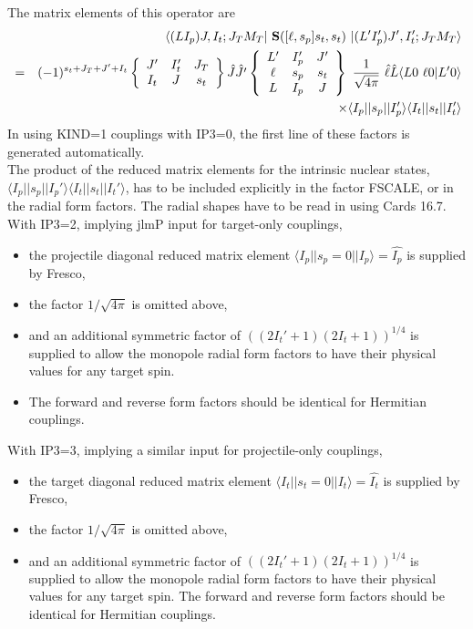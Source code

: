 \documentclass[11pt]{article}
\begin{document}
The  matrix elements of this operator are
\begin{eqnarray}
&& \langle(LI_p)J,I_t;J_TM_T | ~{\bf S}([\ell,s_p]s_t,s_t) ~| (L'I_p')J',I_t';J_TM_T \rangle
   \nonumber \\
& = &  (-1)^{s_t+J_T+J'+I_t}
   \left\{ \begin{array}{ccc}
    J'  & I_t' & J_T \\
    I_t & J    & s_t \\
    \end{array} \right\}   \hat{J} \hat{J'}
    \left\{ \begin{array}{ccc}
    L' & I_p' & J'  \\
    \ell & s_p & s_t  \\
    L & I_p & J  \\
    \end{array} \right\}  ~
     \frac{1}{\sqrt{4\pi}} ~ \hat{\ell} \hat{L} \langle L 0 \ \ell 0 | L'0 \rangle   \nonumber \\
    &  &   \times \langle I_p||s_p||I_p'\rangle \langle I_t||s_t||I_t'\rangle
\end{eqnarray}
In using KIND=1 couplings with IP3=0, the first line of these factors is generated automatically. \\
The product of the
reduced matrix elements for the intrinsic nuclear states,
$\langle I_p||s_p||I_p'\rangle \langle I_t||s_t||I_t'\rangle$,
 has to be included explicitly in the factor FSCALE,
 or in the radial form factors.
The radial shapes have to be read in using Cards 16.7.\\

With IP3=2, implying jlmP input for target-only couplings,
\begin{itemize}
\item
 the projectile diagonal reduced matrix element
$\langle I_p||s_p=0||I_p\rangle = \hat{I_p}$ is supplied by Fresco,
\item
the factor $1/\sqrt{4\pi}$ is omitted above,
\item
and an additional symmetric factor of
$((2I_t'+1)(2I_t+1))^{1/4}$
is supplied to allow the
monopole radial form factors to have their physical
values for any target spin.
\item
The forward and reverse form factors should be identical for Hermitian couplings.

\end{itemize}

With IP3=3, implying a similar input for projectile-only couplings,
\begin{itemize}
\item
 the target diagonal reduced matrix element
 $\langle I_t||s_t=0||I_t\rangle = \hat{I_t}$ is supplied by Fresco,
 \item
 the factor $1/\sqrt{4\pi}$ is omitted above,
 \item
 and an additional symmetric factor of $((2I_t'+1)(2I_t+1))^{1/4}$
 is supplied to allow the monopole radial form factors to have their physical
 values for any target spin.
 The forward and reverse form factors should be identical for Hermitian couplings.
\end{itemize}
\end{document}
